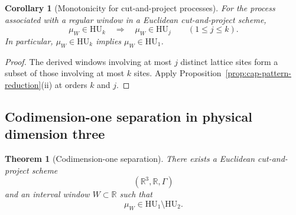 \documentclass[11pt,reqno,a4paper]{amsart}
\numberwithin{equation}{section}
\theoremstyle{compact}
\newtheorem{theorem}{Theorem}[section]
\newtheorem{corollary}[corollary]{Corollary}
\theoremstyle{definition}
\theoremstyle{definition}
\newcommand{\HU}{\mathrm{HU}}
\begin{document}
\begin{corollary}[Monotonicity for cut-and-project processes]
\label{cor:cap-monotonicity}
For the process associated with a regular window in a Euclidean
cut-and-project scheme,
\begin{equation}\label{eq:cap-monotonicity}
  \mu_W\in\HU_k\quad\Longrightarrow\quad
  \mu_W\in\HU_j\qquad(1\leq j\leq k).
\end{equation}
In particular, $\mu_W\in\HU_k$ implies $\mu_W\in\HU_1$.
\end{corollary}

\begin{proof}
The derived windows involving at most $j$ distinct lattice sites form a
subset of those involving at most $k$ sites.  Apply
Proposition~\ref{prop:cap-pattern-reduction}(ii) at orders $k$ and $j$.
\end{proof}

\subsection{Codimension-one separation in physical dimension three}
\label{subsec:cap-codim-one-separation}

\begin{theorem}[Codimension-one separation]
\label{thm:cap-codim-one-separation}
There exists a Euclidean cut-and-project scheme
\[
  (\mathbb R^3,\mathbb R,\Gamma)
\]
and an interval window $W\subset\mathbb R$ such that
\begin{equation}\label{eq:cap-codim-one-separation}
  \mu_W\in\HU_1\setminus\HU_2.
\end{equation}
\end{theorem}
\end{document}
